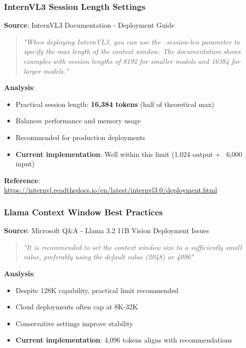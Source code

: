 \documentclass[11pt,a4paper]{article}
\begin{document}
\subsubsection{InternVL3 Session Length Settings}

\textbf{Source}: InternVL3 Documentation - Deployment Guide

\begin{quote}
\textit{"When deploying InternVL3, you can use the --session-len parameter to specify the max length of the context window. The documentation shows examples with session lengths of 8192 for smaller models and 16384 for larger models."}
\end{quote}

\textbf{Analysis}:
\begin{itemize}[leftmargin=*]
    \item Practical session length: \textbf{16,384 tokens} (half of theoretical max)
    \item Balances performance and memory usage
    \item Recommended for production deployments
    \item \textbf{Current implementation}: Well within this limit (1,024 output + ~6,000 input)
\end{itemize}

\textbf{Reference}: \url{https://internvl.readthedocs.io/en/latest/internvl3.0/deployment.html}

\subsubsection{Llama Context Window Best Practices}

\textbf{Source}: Microsoft Q\&A - Llama 3.2 11B Vision Deployment Issues

\begin{quote}
\textit{"It is recommended to set the context window size to a sufficiently small value, preferably using the default value (2048) or 4096"}
\end{quote}

\textbf{Analysis}:
\begin{itemize}[leftmargin=*]
    \item Despite 128K capability, practical limit recommended
    \item Cloud deployments often cap at 8K-32K
    \item Conservative settings improve stability
    \item \textbf{Current implementation}: 4,096 tokens aligns with recommendations
\end{itemize}
\end{document}

